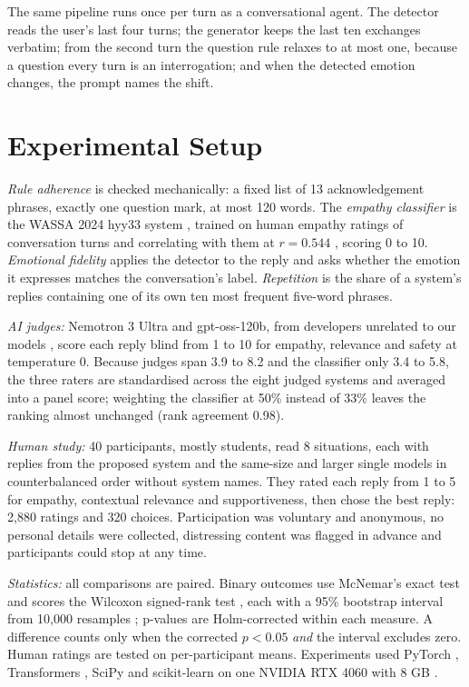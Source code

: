 The same pipeline runs once per turn as a conversational agent. The detector reads the user's last four turns; the generator keeps the last ten exchanges verbatim; from the second turn the question rule relaxes to at most one, because a question every turn is an interrogation; and when the detected emotion changes, the prompt names the shift.

\section{Experimental Setup}\label{sec:setup}
\textit{Rule adherence} is checked mechanically: a fixed list of 13 acknowledgement phrases, exactly one question mark, at most 120 words. The \textit{empathy classifier} is the WASSA 2024 hyy33 system \cite{yang2024hyy33}, trained on human empathy ratings of conversation turns and correlating with them at $r=0.544$ \cite{giorgi2024wassa}, scoring 0 to 10. \textit{Emotional fidelity} applies the detector to the reply and asks whether the emotion it expresses matches the conversation's label. \textit{Repetition} is the share of a system's replies containing one of its own ten most frequent five-word phrases.

\textit{AI judges:} Nemotron 3 Ultra and gpt-oss-120b, from developers unrelated to our models \cite{panickssery2024}, score each reply blind from 1 to 10 for empathy, relevance and safety at temperature 0. Because judges span 3.9 to 8.2 and the classifier only 3.4 to 5.8, the three raters are standardised across the eight judged systems and averaged into a panel score; weighting the classifier at 50\% instead of 33\% leaves the ranking almost unchanged (rank agreement 0.98).

\textit{Human study:} 40 participants, mostly students, read 8 situations, each with replies from the proposed system and the same-size and larger single models in counterbalanced order without system names. They rated each reply from 1 to 5 for empathy, contextual relevance and supportiveness, then chose the best reply: 2,880 ratings and 320 choices. Participation was voluntary and anonymous, no personal details were collected, distressing content was flagged in advance and participants could stop at any time.

\textit{Statistics:} all comparisons are paired. Binary outcomes use McNemar's exact test \cite{mcnemar1947} and scores the Wilcoxon signed-rank test \cite{wilcoxon1945}, each with a 95\% bootstrap interval from 10,000 resamples \cite{efron1993}; p-values are Holm-corrected \cite{holm1979} within each measure. A difference counts only when the corrected $p<0.05$ \textit{and} the interval excludes zero. Human ratings are tested on per-participant means. Experiments used PyTorch \cite{paszke2019pytorch}, Transformers \cite{wolf2020transformers}, SciPy \cite{virtanen2020scipy} and scikit-learn \cite{pedregosa2011sklearn} on one NVIDIA RTX 4060 with 8 GB \cite{nvidia_rtx4060}.

